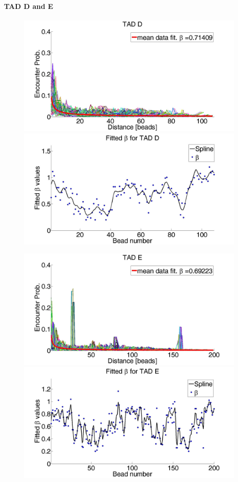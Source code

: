 \documentclass[8pt]{beamer}
\begin{document}
\begin{frame}
\framesubtitle{TAD D and E}
\begin{figure}[H]
\includegraphics[scale=0.1]{meanDataFitTADD}
\includegraphics[scale=0.1]{fittedExpValuesWithSplineAverageTADD}
\end{figure}

\begin{figure}[H]
\includegraphics[scale=0.1]{meanDataFitTADE}
\includegraphics[scale=0.1]{fittedExpValuesWithSplineAverageTADE}
\end{figure}
\end{frame}
\end{document}
